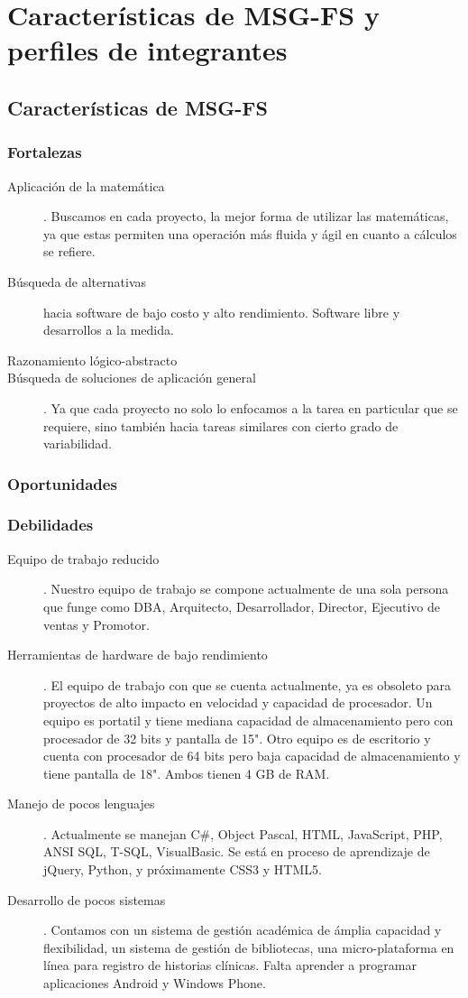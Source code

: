 \documentclass[12pt,spanish,lettersize]{report}
\begin{document}
\chapter{Caracter\'isticas de MSG-FS y perfiles de integrantes}
\section{Caracter\'isticas de MSG-FS}
\subsection{Fortalezas}
\begin{description}
\item[Aplicaci\'on de la matem\'atica]. Buscamos en cada proyecto, la mejor forma de utilizar las matem\'aticas, ya que estas permiten una operaci\'on m\'as fluida y \'agil en cuanto a c\'alculos se refiere.
\item[B\'usqueda de alternativas] hacia software de bajo costo y alto rendimiento. Software libre y desarrollos a la medida.
\item[Razonamiento l\'ogico-abstracto]
\item[B\'usqueda de soluciones de aplicaci\'on general]. Ya que cada proyecto no solo lo enfocamos a la tarea en particular que se requiere, sino tambi\'en hacia tareas similares con cierto grado de variabilidad.
\end{description}
\subsection{Oportunidades}
\subsection{Debilidades}
\begin{description}
\item[Equipo de trabajo reducido]. Nuestro equipo de trabajo se compone actualmente de una sola persona que funge como DBA, Arquitecto, Desarrollador, Director, Ejecutivo de ventas y Promotor.
\item[Herramientas de hardware de bajo rendimiento]. El equipo de trabajo con que se cuenta actualmente, ya es obsoleto para proyectos de alto impacto en velocidad y capacidad de procesador. Un equipo es portatil y tiene mediana capacidad de almacenamiento pero con procesador de 32 bits y pantalla de 15". Otro equipo es de escritorio y cuenta con procesador de 64 bits pero baja capacidad de almacenamiento y tiene pantalla de 18". Ambos tienen 4 GB de RAM.
\item[Manejo de pocos lenguajes]. Actualmente se manejan C\#, Object Pascal, HTML, JavaScript, PHP, ANSI SQL, T-SQL, VisualBasic. Se est\'a en proceso de aprendizaje de jQuery, Python, y pr\'oximamente CSS3 y HTML5.
\item[Desarrollo de pocos sistemas]. Contamos con un sistema de gesti\'on acad\'emica de \'amplia capacidad y flexibilidad, un sistema de gesti\'on de bibliotecas, una micro-plataforma en l\'inea para registro de historias cl\'inicas. Falta aprender a programar aplicaciones Android y Windows Phone.
\end{description}
\end{document}
